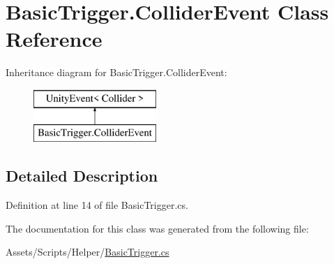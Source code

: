 \hypertarget{class_basic_trigger_1_1_collider_event}{}\section{Basic\+Trigger.\+Collider\+Event Class Reference}
\label{class_basic_trigger_1_1_collider_event}
Inheritance diagram for Basic\+Trigger.\+Collider\+Event\+:\begin{figure}[H]
\begin{center}
\leavevmode
\includegraphics[height=2.000000cm]{class_basic_trigger_1_1_collider_event}
\end{center}
\end{figure}


\subsection{Detailed Description}


Definition at line 14 of file Basic\+Trigger.\+cs.



The documentation for this class was generated from the following file\+:\begin{DoxyCompactItemize}
\item 
Assets/\+Scripts/\+Helper/\mbox{\hyperlink{_basic_trigger_8cs}{Basic\+Trigger.\+cs}}\end{DoxyCompactItemize}

